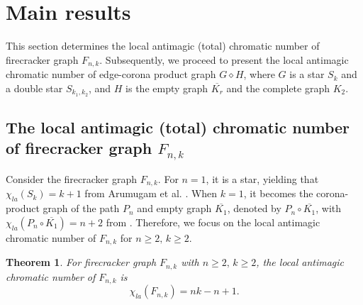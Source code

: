 \documentclass[12pt]{article}
\newtheorem{theorem}{Theorem}[section]
\begin{document}
\section{Main results}

This section determines the local antimagic (total) chromatic number of firecracker graph $F_{n,k}$. Subsequently, we proceed to present the local antimagic chromatic number of edge-corona product graph $G\diamond H$, where $G$ is a star $S_{k}$ and a double star $S_{k_{1},k_{2}}$, and $H$ is the empty graph $\overline{K_{r}}$ and the complete graph $K_{2}$.

\subsection{The local antimagic (total) chromatic number of firecracker graph $F_{n,k}$}

Consider the firecracker graph $F_{n,k}$.
For $n=1$, it is a star, yielding that $\chi_{la}(S_{k})=k+1$ from Arumugam et al. \cite{Arumugam-1}.
When $k=1$, it becomes the corona-product graph of the path $P_{n}$ and empty graph $\overline{K_{1}}$, denoted by $P_{n}\circ \overline{K_{1}}$, with $\chi_{la}(P_{n}\circ \overline{K_{1}})=n+2$ from \cite{Arumugam-3}. Therefore, we focus on the local antimagic chromatic number of $F_{n,k}$ for $n\geq 2,\,k\geq 2$.%

\begin{theorem}
For firecracker graph $F_{n,k}$ with $n\geq 2,\,k\geq 2$, the local antimagic chromatic number of $F_{n,k}$ is
\begin{equation*}
\chi_{la}(F_{n,k})=nk-n+1.
\end{equation*}
\end{theorem}
\end{document}
